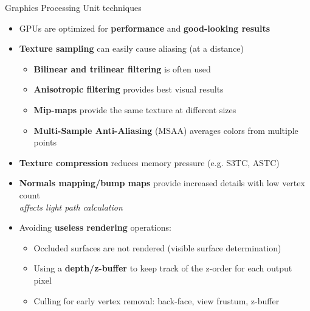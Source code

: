 \begin{frame}{Graphics Processing Unit techniques}
  \begin{itemize}
  \item GPUs are optimized for \textbf{performance} and \textbf{good-looking results}
  \item \textbf{Texture sampling} can easily cause aliasing (at a distance)
    \begin{itemize}
    \item \textbf{Bilinear and trilinear filtering} is often used
    \item \textbf{Anisotropic filtering} provides best visual results
    \item \textbf{Mip-maps} provide the same texture at different sizes
    \item \textbf{Multi-Sample Anti-Aliasing} (MSAA) averages colors from multiple points
    \end{itemize}
  \item \textbf{Texture compression} reduces memory pressure (e.g. S3TC, ASTC)
  \item \textbf{Normals mapping/bump maps} provide increased details with low vertex count\\
    \textit{affects light path calculation}
  \item Avoiding \textbf{useless rendering} operations:
    \begin{itemize}
    \item Occluded surfaces are not rendered (visible surface determination)
    \item Using a \textbf{depth/z-buffer} to keep track of the z-order for each output pixel
    \item Culling for early vertex removal: back-face, view frustum, z-buffer
    \end{itemize}
  \end{itemize}
\end{frame}

